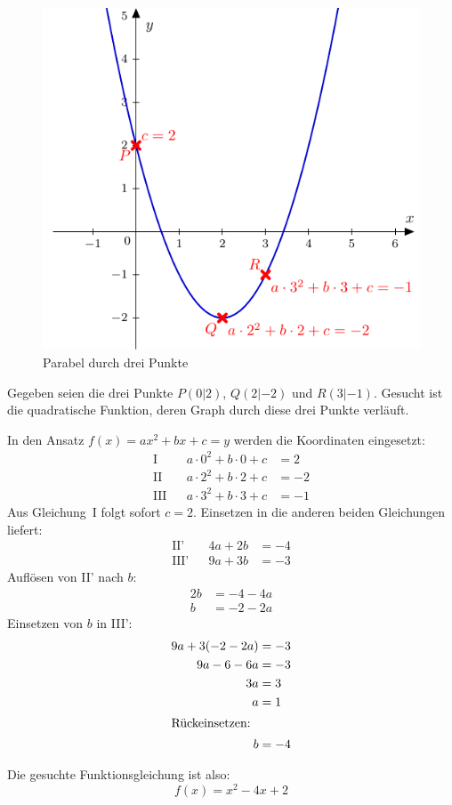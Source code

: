 \begin{bsp}
 \begin{figure}[ht]
 \includegraphics[width=\textwidth]{./parabelfit.pdf}
 \caption{Parabel durch drei Punkte}
 \label{fig:parabelfit}
\end{figure}
 Gegeben seien die drei Punkte \(P(0|2)\), \(Q(2|-2)\) und \(R(3|-1)\). Gesucht ist die quadratische Funktion, deren Graph durch diese drei Punkte verläuft.
 
 In den Ansatz \(f(x)=ax^2+bx+c=y\) werden die Koordinaten eingesetzt:
 \begin{align*}
  \text{I} && a\cdot 0^2 + b\cdot 0 +c &= 2 \\
  \text{II} && a\cdot 2^2 + b \cdot 2 + c &= -2 \\
  \text{III} && a\cdot 3^2 + b \cdot 3 + c &= -1 
 \end{align*}
 Aus Gleichung~I folgt sofort \(c=2\). Einsetzen in die anderen beiden Gleichungen liefert:
 \begin{align*}
  \text{II'} && 4a + 2b &= -4 \\
  \text{III'} && 9a + 3b &= -3
 \end{align*}
 Auflösen von II' nach \(b\):
 \begin{align*}
  2b &= -4-4a \\
  b &= -2-2a
 \end{align*}
 Einsetzen von \(b\) in III':
 \begin{align*}
  9a+3(-2-2a) &= -3\\
  9a-6-6a &= -3 \\
  3a &= 3 \\
  a&=1\\
  \intertext{Rückeinsetzen:}
  b &= -4
 \end{align*}

 Die gesuchte Funktionsgleichung ist also:
 \begin{equation*}
  f(x) = x^2-4x+2
 \end{equation*} 

\end{bsp}




